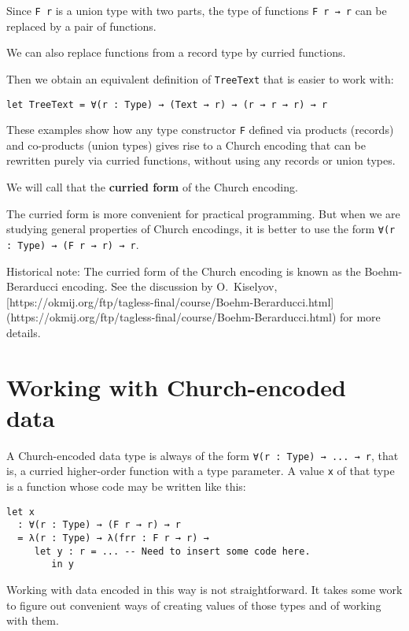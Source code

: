 Since \lstinline!F r! is a union type with two parts, the type of functions \lstinline!F r → r! can be replaced by a pair of functions.


We can also replace functions from a record type by curried functions.


Then we obtain an equivalent definition of \lstinline!TreeText! that is easier to work with:


\begin{lstlisting}[language=Dhall]
let TreeText = ∀(r : Type) → (Text → r) → (r → r → r) → r
\end{lstlisting}


These examples show how any type constructor \lstinline!F! defined via products (records) and co-products (union types) gives rise to a Church encoding that can be rewritten purely via curried functions, without using any records or union types.


We will call that the \textbf{curried form} of the Church encoding.


The curried form is more convenient for practical programming.
But when we are studying general properties of Church encodings, it is better to use the form \lstinline!∀(r : Type) → (F r → r) → r!.


Historical note: The curried form of the Church encoding is known as the Boehm-Berarducci encoding.
See the discussion by O. Kiselyov, [https://okmij.org/ftp/tagless-final/course/Boehm-Berarducci.html](https://okmij.org/ftp/tagless-final/course/Boehm-Berarducci.html) for more details.


\section{Working with Church-encoded data}


A Church-encoded data type is always of the form \lstinline!∀(r : Type) → ... → r!, that is, a curried higher-order function with a type parameter.
A value \lstinline!x! of that type is a function whose code may be written like this:


\begin{lstlisting}[language=Dhall]
let x
  : ∀(r : Type) → (F r → r) → r
  = λ(r : Type) → λ(frr : F r → r) →
     let y : r = ... -- Need to insert some code here.
        in y
\end{lstlisting}


Working with data encoded in this way is not straightforward.
It takes some work to figure out convenient ways of creating values of those types and of working with them.


